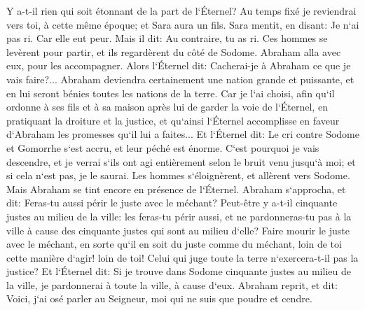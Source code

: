 \verse Y a-t-il rien qui soit étonnant de la part de l`Éternel? Au temps fixé je reviendrai vers toi, à cette même époque; et Sara aura un fils. 
\verse Sara mentit, en disant: Je n`ai pas ri. Car elle eut peur. Mais il dit: Au contraire, tu as ri. 
\verse Ces hommes se levèrent pour partir, et ils regardèrent du côté de Sodome. Abraham alla avec eux, pour les accompagner. 
\verse Alors l`Éternel dit: Cacherai-je à Abraham ce que je vais faire?... 
\verse Abraham deviendra certainement une nation grande et puissante, et en lui seront bénies toutes les nations de la terre. 
\verse Car je l`ai choisi, afin qu`il ordonne à ses fils et à sa maison après lui de garder la voie de l`Éternel, en pratiquant la droiture et la justice, et qu`ainsi l`Éternel accomplisse en faveur d`Abraham les promesses qu`il lui a faites... 
\verse Et l`Éternel dit: Le cri contre Sodome et Gomorrhe s`est accru, et leur péché est énorme. 
\verse C`est pourquoi je vais descendre, et je verrai s`ils ont agi entièrement selon le bruit venu jusqu`à moi; et si cela n`est pas, je le saurai. 
\verse Les hommes s`éloignèrent, et allèrent vers Sodome. Mais Abraham se tint encore en présence de l`Éternel. 
\verse Abraham s`approcha, et dit: Feras-tu aussi périr le juste avec le méchant? 
\verse Peut-être y a-t-il cinquante justes au milieu de la ville: les feras-tu périr aussi, et ne pardonneras-tu pas à la ville à cause des cinquante justes qui sont au milieu d`elle? 
\verse Faire mourir le juste avec le méchant, en sorte qu`il en soit du juste comme du méchant, loin de toi cette manière d`agir! loin de toi! Celui qui juge toute la terre n`exercera-t-il pas la justice? 
\verse Et l`Éternel dit: Si je trouve dans Sodome cinquante justes au milieu de la ville, je pardonnerai à toute la ville, à cause d`eux. 
\verse Abraham reprit, et dit: Voici, j`ai osé parler au Seigneur, moi qui ne suis que poudre et cendre. 
